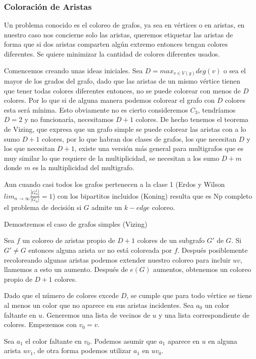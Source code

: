 \documentclass[a4paper]{article}
\begin{document}
\subsubsection{Coloraci\'on de Aristas}
 Un problema conocido es el coloreo de grafos, ya sea en v\'ertices o en aristas, en nuestro caso nos concierne solo las aristas, queremos etiquetar las aristas de forma que si dos aristas comparten alg\'un extremo entonces tengan colores diferentes. Se quiere minimizar la cantidad de colores diferentes usados.


 Comencemos creando unas ideas iniciales. Sea $D = max_{v \in V(g)}deg(v)$ o sea el mayor de los grados del grafo, dado que las aristas de un mismo v\'ertice tienen que tener todas colores diferentes entonces, no se puede colorear con menos de $D$ colores. Por lo que si de alguna manera podemos colorear el grafo con $D$ colores esta ser\'a m\'inima. Esto obviamente no es cierto consideremos $C_3$, tendr\'iamos $D = 2$ y no funcionar\'ia, necesitamos $D+1$ colores. De hecho tenemos el teorema de Vizing, que expresa que un grafo simple se puede colorear las aristas con a lo sumo $D + 1$ colores, por lo que habran dos clases de grafos, los que necesitan $D$ y los que necesitan $D+1$, existe una versi\'on m\'as general para multigrafos que es muy similar lo que requiere de la multiplicidad, se necesitan a los sumo $D + m$ donde $m$ es la multiplicidad del multigrafo.

 Aun cuando casi todos los grafos pertenecen a la clase 1 (Erdos y Wilson $lim_{n \rightarrow  \infty} \frac{|G_n^1|}{|G_n|} = 1$) con los bipartitos incluidos (Koning) resulta que es Np completo el problema de decisi\'on si $G$ admite un $k-edge$ coloreo.

 Demostremos el caso de grafos simples (Vizing)

 Sea $f$ un coloreo de aristas propio de $D + 1$ colores de un subgrafo $G'$ de $G$. Si $G' \neq G $ entonces alguna arista $uv$ no est\'a coloreada por $f$. Despu\'es posiblemente recoloreando algunas aristas podemos extender nuestro coloreo para incluir $uv$, llamemos a esto un aumento. Despu\'es de $e(G)$ aumentos, obtenemos un coloreo propio de $D + 1$ colores. 
 
 Dado que el n\'umero de colores excede $D$, se cumple que para todo v\'ertice se tiene al menos un color que no aparece en sus aristas incidentes. Sea $a_0$ un color faltante en $u$. Generemos una lista de vecinos de $u$ y una lista correspondiente de colores. Empezemos con $v_0 = v$.
 
 Sea $a_1$ el color faltante en $v_0$. Podemos asumir que $a_1$ aparece en $u$ en alguna arista $uv_1$, de otra forma podemos utilizar $a_1$ en $uv_0$.
 
\end{document}
